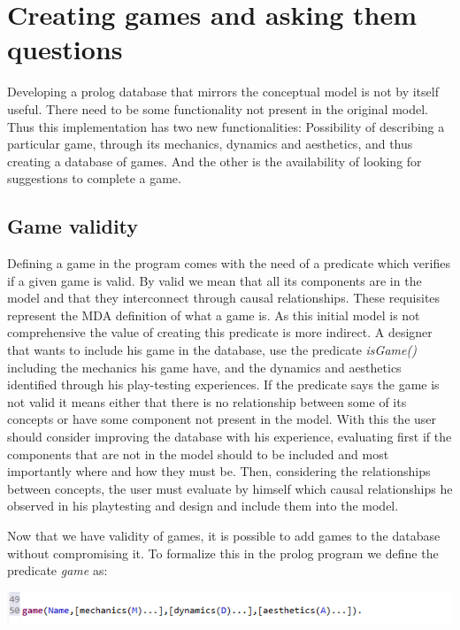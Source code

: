 \section{Creating games and asking them questions}

Developing a prolog database that mirrors the conceptual model is not by itself useful. There need to be some functionality not present in the original model. Thus this implementation has two new functionalities: Possibility of describing a particular game, through its mechanics, dynamics and aesthetics, and thus creating a database of games. And the other is the availability of looking for suggestions to complete a game. 

\subsection{Game validity}

Defining a game in the program comes with the need of a predicate which verifies if a given game is valid. By valid we mean that all its components are in the model and that they interconnect through causal relationships. These requisites represent the MDA definition of what a game is. As this initial model is not comprehensive the value of creating this predicate is more indirect. A designer that wants to include his game in the database, use the predicate \textit{isGame()} including the mechanics his game have, and the dynamics and aesthetics identified through his play-testing experiences. If the predicate says the game is not valid it means either that there is no relationship between some of its concepts or have some component not present in the model. With this the user should consider improving the database with his experience, evaluating first if the components that are not in the model should to be included and most importantly where and how they must be. Then, considering the relationships between concepts, the user must evaluate by himself which causal relationships he observed in his playtesting and design and include them into the model.

Now that we have validity of games, it is possible to add games to the database without compromising it. To formalize this in the prolog program we define the predicate \textit{game} as:
\newline

\includegraphics[]{Images/prologGame.png}

